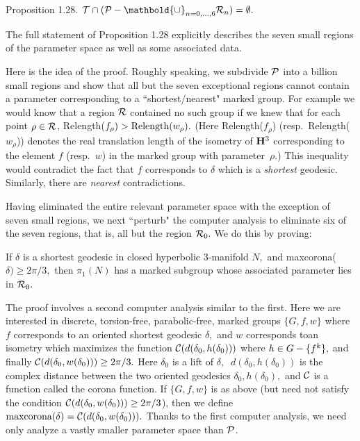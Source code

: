  {\elevensc Proposition 1.28}.
${\cal T} \cap ({\cal P} - \mathbold{\cup}_{n=0,\ldots,6}{\cal R}_n) = \emptyset.$
\vfill

The full statement of Proposition 1.28 explicitly describes the seven small
regions of the parameter space as well as some associated data.

Here is the idea of the proof.
Roughly speaking, we subdivide ${\cal P}$ into a billion small regions and 
show that all but the seven exceptional regions cannot contain 
a parameter corresponding to a  
``shortest/nearest" marked group.
For example we would know that 
a region ${\cal R}$ contained no such group if we knew that for each 
point $\rho\in {\cal R}$,
Relength($f_\rho) > {\rm Relength}(w_\rho).$  
(Here Relength($f_\rho$) (resp.\ Relength($w_\rho^{\phantom{|}}$))
denotes the real translation length of the isometry of ${\bf H}^3$ 
corresponding to
the element $f$ (resp.\ $w$) in the marked group with parameter~$\rho.$)
This inequality would contradict the fact that $f$ corresponds to $\delta$ 
which is a {\it shortest} geodesic.  Similarly, there are {\it nearest}
contradictions.

Having eliminated the entire relevant parameter space 
with the 
exception of seven small regions, we next ``perturb" the computer analysis to 
eliminate six of the seven regions, that is, all but the region ${\cal R}_0.$
We do this by proving:

   \hglue-9pt
 If $\delta$ is a shortest geodesic in closed hyperbolic $3$\/{\rm -}\/manifold $N,$ and
maxcorona($\delta) \ge 2\pi/3,$ then $\pi_1(N)$ has a marked subgroup 
whose associated parameter lies in
${\cal R}_0.$
\endproclaim

The proof
involves a second computer analysis similar to the first.  Here we 
are interested in discrete, torsion-free, parabolic-free, 
marked groups $\{G,f,w\}$ where $f$ corresponds to an oriented
shortest geodesic $\delta,$ and $w$ corresponds  to\break an isometry which 
maximizes
the function ${\cal C}(d(\delta_0,h(\delta_0)))$ where 
$h\in\break  G-\{f^k\},$ and finally
${\cal C} (d(\delta_0,w(\delta_0)))\ge 2\pi/3.$  Here $\delta_0$ is a lift of 
$\delta,$
$\ d(\delta_0,h(\delta_0))$ is the complex distance between the two 
oriented
geodesics $\delta_0, h(\delta_0),$ and ${\cal C}$ is a function called the 
corona function.
If $\{G,f,w\}$ is as above (but need not satisfy the condition 
${\cal C} (d(\delta_0,w(\delta_0)))\ge 2\pi/3$), then we define
${\rm maxcorona}(\delta) = {\cal C} (d(\delta_0,w(\delta_0))).$
Thanks to the first computer analysis, 
we need only analyze a vastly smaller parameter
space than ${\cal P}$.

